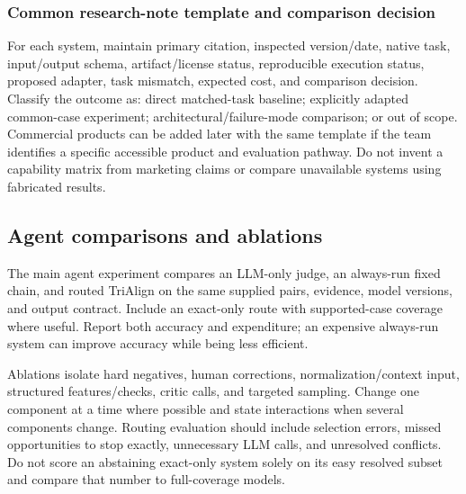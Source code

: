 \documentclass[10pt,letterpaper]{article}
\begin{document}
\subsubsection{Common research-note template and comparison decision}
For each system, maintain primary citation, inspected version/date, native
task, input/output schema, artifact/license status, reproducible execution
status, proposed adapter, task mismatch, expected cost, and comparison
decision. Classify the outcome as: direct matched-task baseline; explicitly
adapted common-case experiment; architectural/failure-mode comparison; or
out of scope. Commercial products can be added later with the same template
if the team identifies a specific accessible product and evaluation pathway.
Do not invent a capability matrix from marketing claims or compare unavailable
systems using fabricated results.

\subsection{Agent comparisons and ablations}
The main agent experiment compares an LLM-only judge, an always-run fixed
chain, and routed TriAlign on the same supplied pairs, evidence, model
versions, and output contract. Include an exact-only route with supported-case
coverage where useful. Report both accuracy and expenditure; an expensive
always-run system can improve accuracy while being less efficient.

Ablations isolate hard negatives, human corrections, normalization/context
input, structured features/checks, critic calls, and targeted sampling.
Change one component at a time where possible and state interactions when
several components change. Routing evaluation should include selection errors,
missed opportunities to stop exactly, unnecessary LLM calls, and unresolved
conflicts. Do not score an abstaining exact-only system solely on its easy
resolved subset and compare that number to full-coverage models.
\end{document}
